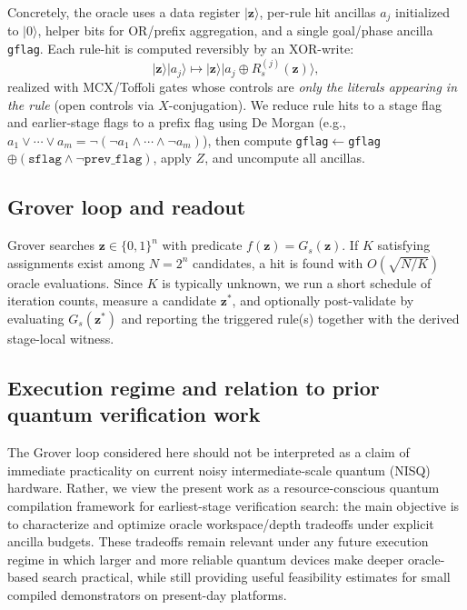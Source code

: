 \documentclass[conference]{IEEEtran}
\newcommand{\zvec}{\mathbf{z}}
\begin{document}
Concretely, the oracle uses a data register $|\zvec\rangle$, per-rule hit ancillas $a_j$ initialized to $|0\rangle$,
helper bits for OR/prefix aggregation, and a single goal/phase ancilla \texttt{gflag}.
Each rule-hit is computed reversibly by an XOR-write:
\[
|\zvec\rangle|a_j\rangle \mapsto |\zvec\rangle|a_j\oplus R_{s}^{(j)}(\zvec)\rangle,
\]
realized with MCX/Toffoli gates whose controls are \emph{only the literals appearing in the rule} (open controls via $X$-conjugation).\cite{Barenco1995ElementaryGates,nielsenchuang2010}
We reduce rule hits to a stage flag and earlier-stage flags to a prefix flag using De Morgan
(e.g., $a_1\vee\cdots\vee a_m=\neg(\neg a_1\wedge\cdots\wedge \neg a_m)$),
then compute \texttt{gflag}$\leftarrow$\texttt{gflag}$\oplus(\texttt{sflag}\wedge \neg\texttt{prev\_flag})$, apply $Z$, and uncompute all ancillas.

\subsection{Grover loop and readout}
Grover searches $\zvec\in\{0,1\}^n$ with predicate $f(\zvec)=G_s(\zvec)$.\cite{grover1996,boyer1998tight,zalka1999optimal,brassard2002amplification}
If $K$ satisfying assignments exist among $N=2^n$ candidates, a hit is found with
$O(\sqrt{N/K})$ oracle evaluations.\cite{grover1996,boyer1998tight,zalka1999optimal}
Since $K$ is typically unknown, we run a short schedule of iteration counts,
measure a candidate $\zvec^{\ast}$, and optionally post-validate by evaluating $G_s(\zvec^{\ast})$ and reporting the triggered rule(s) together with the derived stage-local witness.\cite{boyer1998tight,brassard2002amplification}

\subsection{Execution regime and relation to prior quantum verification work}
The Grover loop considered here should not be interpreted as a claim of immediate practicality on current noisy intermediate-scale quantum (NISQ) hardware. Rather, we view the present work as a resource-conscious quantum compilation framework for earliest-stage verification search: the main objective is to characterize and optimize oracle workspace/depth tradeoffs under explicit ancilla budgets. These tradeoffs remain relevant under any future execution regime in which larger and more reliable quantum devices make deeper oracle-based search practical, while still providing useful feasibility estimates for small compiled demonstrators on present-day platforms.\cite{preskill2018nisq,endo2018practicalqem,cai2023qem}
\end{document}
